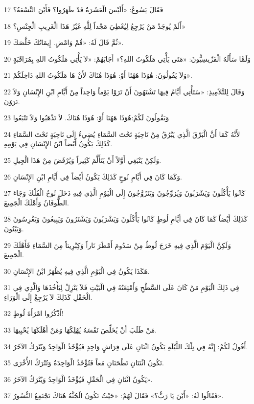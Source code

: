 \par 17 فَقَالَ يَسُوعُ: «أَلَيْسَ الْعَشَرَةُ قَدْ طَهَرُوا؟ فَأَيْنَ التِّسْعَةُ؟
\par 18 أَلَمْ يُوجَدْ مَنْ يَرْجِعُ لِيُعْطِيَ مَجْداً لِلَّهِ غَيْرُ هَذَا الْغَرِيبِ الْجِنْسِ؟»
\par 19 ثُمَّ قَالَ لَهُ: «قُمْ وَامْضِ. إِيمَانُكَ خَلَّصَكَ».
\par 20 وَلَمَّا سَأَلَهُ الْفَرِّيسِيُّونَ: «مَتَى يَأْتِي مَلَكُوتُ اللهِ؟» أَجَابَهُمْ: «لاَ يَأْتِي مَلَكُوتُ اللهِ بِمُرَاقَبَةٍ
\par 21 وَلاَ يَقُولُونَ: هُوَذَا هَهُنَا أَوْ: هُوَذَا هُنَاكَ لأَنْ هَا مَلَكُوتُ اللهِ دَاخِلَكُمْ».
\par 22 وَقَالَ لِلتَّلاَمِيذِ: «سَتَأْتِي أَيَّامٌ فِيهَا تَشْتَهُونَ أَنْ تَرَوْا يَوْماً وَاحِداً مِنْ أَيَّامِ ابْنِ الإِنْسَانِ وَلاَ تَرَوْنَ.
\par 23 وَيَقُولُونَ لَكُمْ:هُوَذَا هَهُنَا أَوْ: هُوَذَا هُنَاكَ. لاَ تَذْهَبُوا وَلاَ تَتْبَعُوا
\par 24 لأَنَّهُ كَمَا أَنَّ الْبَرْقَ الَّذِي يَبْرُقُ مِنْ نَاحِيَةٍ تَحْتَ السَّمَاءِ يُضِيءُ إِلَى نَاحِيَةٍ تَحْتَ السَّمَاءِ كَذَلِكَ يَكُونُ أَيْضاً ابْنُ الإِنْسَانِ فِي يَوْمِهِ.
\par 25 وَلَكِنْ يَنْبَغِي أَوَّلاً أَنْ يَتَأَلَّمَ كَثِيراً وَيُرْفَضَ مِنْ هَذَا الْجِيلِ.
\par 26 وَكَمَا كَانَ فِي أَيَّامِ نُوحٍ كَذَلِكَ يَكُونُ أَيْضاً فِي أَيَّامِ ابْنِ الإِنْسَانِ.
\par 27 كَانُوا يَأْكُلُونَ وَيَشْرَبُونَ وَيُزوِّجُونَ وَيَتَزَوَّجُونَ إِلَى الْيَوْمِ الَّذِي فِيهِ دَخَلَ نُوحٌ الْفُلْكَ وَجَاءَ الطُّوفَانُ وَأَهْلَكَ الْجَمِيعَ.
\par 28 كَذَلِكَ أَيْضاً كَمَا كَانَ فِي أَيَّامِ لُوطٍ كَانُوا يَأْكُلُونَ وَيَشْرَبُونَ وَيَشْتَرُونَ وَيَبِيعُونَ وَيَغْرِسُونَ وَيَبْنُونَ.
\par 29 وَلَكِنَّ الْيَوْمَ الَّذِي فِيهِ خَرَجَ لُوطٌ مِنْ سَدُومَ أَمْطَرَ نَاراً وَكِبْرِيتاً مِنَ السَّمَاءِ فَأَهْلَكَ الْجَمِيعَ.
\par 30 هَكَذَا يَكُونُ فِي الْيَوْمِ الَّذِي فِيهِ يُظْهَرُ ابْنُ الإِنْسَانِ.
\par 31 فِي ذَلِكَ الْيَوْمِ مَنْ كَانَ عَلَى السَّطْحِ وَأَمْتِعَتُهُ فِي الْبَيْتِ فَلاَ يَنْزِلْ لِيَأْخُذَهَا وَالَّذِي فِي الْحَقْلِ كَذَلِكَ لاَ يَرْجِعْ إِلَى الْوَرَاءِ.
\par 32 اُذْكُرُوا امْرَأَةَ لُوطٍ!
\par 33 مَنْ طَلَبَ أَنْ يُخَلِّصَ نَفْسَهُ يُهْلِكُهَا وَمَنْ أَهْلَكَهَا يُحْيِيهَا.
\par 34 أَقُولُ لَكُمْ: إِنَّهُ فِي تِلْكَ اللَّيْلَةِ يَكُونُ اثْنَانِ عَلَى فِرَاشٍ وَاحِدٍ فَيُؤْخَذُ الْوَاحِدُ وَيُتْرَكُ الآخَرُ.
\par 35 تَكُونُ اثْنَتَانِ تَطْحَنَانِ مَعاً فَتُؤْخَذُ الْوَاحِدَةُ وَتُتْرَكُ الأُخْرَى.
\par 36 يَكُونُ اثْنَانِ فِي الْحَقْلِ فَيُؤْخَذُ الْوَاحِدُ وَيُتْرَكُ الآخَرُ».
\par 37 فَقَالُوا لَهُ: «أَيْنَ يَا رَبُّ؟» فَقَالَ لَهُمْ: «حَيْثُ تَكُونُ الْجُثَّةُ هُنَاكَ تَجْتَمِعُ النُّسُورُ».

